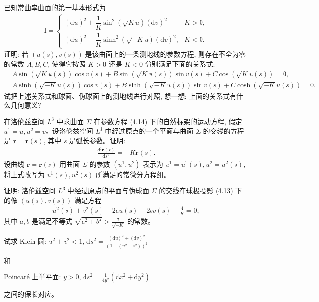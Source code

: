 \documentclass[../../main.tex]{subfiles}%
\begin{document}
\begin{example}
已知常曲率曲面的第一基本形式为
\begin{align*}
\mathrm{I}=
\begin{cases}
(\mathrm{d}u)^2+\dfrac{1}{K}\sin^2(\sqrt{K}u)(\mathrm{d}v)^2, & K>0,\\
(\mathrm{d}u)^2-\dfrac{1}{K}\sinh^2(\sqrt{-K}u)(\mathrm{d}v)^2, & K<0.
\end{cases}
\end{align*}
证明: 若 $(u(s),v(s))$ 是该曲面上的一条测地线的参数方程, 则存在不全为零的常数 $A,B,C$, 使得它按照 $K>0$ 还是 $K<0$ 分别满足下面的关系式:
\begin{align*}
&A\sin(\sqrt{K}u(s))\cos v(s)+B\sin(\sqrt{K}u(s))\sin v(s)+C\cos(\sqrt{K}u(s))=0,\\
&A\sinh(\sqrt{-K}u(s))\cos v(s)+B\sinh(\sqrt{-K}u(s))\sin v(s)+C\cosh(\sqrt{-K}u(s))=0.
\end{align*}
试把上述关系式和球面、伪球面上的测地线进行对照, 想一想: 上面的关系式有什么几何意义?
\end{example}

\begin{example}
在洛伦兹空间 $L^3$ 中求曲面 $\Sigma$ 在参数方程 (4.14) 下的自然标架的运动方程, 假定 $u^1=u,u^2=v$。设洛伦兹空间 $L^3$ 中经过原点的一个平面与曲面 $\Sigma$ 的交线的方程是 $\boldsymbol{r}=\boldsymbol{r}(s)$, 其中 $s$ 是弧长参数。证明:
\begin{align*}
\frac{\mathrm{d}^2\boldsymbol{r}(s)}{\mathrm{d}s^2}=-K\boldsymbol{r}(s).
\end{align*}
设曲线 $\boldsymbol{r}=\boldsymbol{r}(s)$ 用曲面 $\Sigma$ 的参数 $(u^1,u^2)$ 表示为 $u^1=u^1(s),u^2=u^2(s)$, 将上式改写为 $u^1(s),u^2(s)$ 所满足的常微分方程组。
\end{example}

\begin{example}
证明: 洛伦兹空间 $L^3$ 中经过原点的平面与伪球面 $\Sigma$ 的交线在球极投影 (4.13) 下的像 $(u(s),v(s))$ 满足方程
\begin{align*}
u^2(s)+v^2(s)-2au(s)-2bv(s)-\frac{4}{K}=0,
\end{align*}
其中 $a,b$ 是满足不等式 $\sqrt{a^2+b^2}>\frac{2}{\sqrt{-K}}$ 的常数。
\end{example}

\begin{example}
试求
Klein 圆: $u^2+v^2<1$, $\mathrm{d}s^2=\frac{(\mathrm{d}u)^2+(\mathrm{d}v)^2}{(1-(u^2+v^2))^2}$

和

Poincaré 上半平面: $y>0$, $\mathrm{d}s^2=\frac{1}{4y^2}(\mathrm{d}x^2+\mathrm{d}y^2)$

之间的保长对应。
\end{example}
\end{document}

